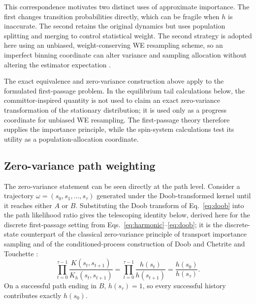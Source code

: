 \documentclass[a4paper,fleqn]{cas-sc}
\begin{document}
This correspondence motivates two distinct uses of approximate importance. The first changes
transition probabilities directly, which can be fragile when $h$ is inaccurate. The second
retains the original dynamics but uses population splitting and merging to control statistical
weight. The second strategy is adopted here using an unbiased, weight-conserving WE resampling
scheme, so an imperfect binning coordinate can alter variance and sampling allocation without
altering the estimator expectation \citep{zhang2010}.

The exact equivalence and zero-variance construction above apply to the formulated first-passage
problem. In the equilibrium tail calculations below, the committor-inspired quantity is not
used to claim an exact zero-variance transformation of the stationary distribution; it is used
only as a progress coordinate for unbiased WE resampling. The first-passage theory therefore
supplies the importance principle, while the spin-system calculations test its utility as a
population-allocation coordinate.

\subsection{Zero-variance path weighting}\label{sec:zerovar}
The zero-variance statement can be seen directly at the path level. Consider a trajectory
$\omega=(s_0,s_1,\dots,s_\tau)$ generated under the Doob-transformed kernel until it reaches
either $A$ or $B$. Substituting the Doob transform of Eq.~\eqref{eq:doob} into the path
likelihood ratio gives the telescoping identity below, derived here for the discrete
first-passage setting from Eqs.~\eqref{eq:harmonic}--\eqref{eq:doob}; it is the discrete-state
counterpart of the classical zero-variance principle of transport importance sampling
\citep{lewins1965,spanier1969,haghighat2003} and of the conditioned-process construction of
Doob \citep{doob1984} and Chetrite and Touchette \citep{chetrite2015}:
\begin{equation}
\prod_{t=0}^{\tau-1}\frac{K(s_t,s_{t+1})}{K_h(s_t,s_{t+1})}
=\prod_{t=0}^{\tau-1}\frac{h(s_t)}{h(s_{t+1})}
=\frac{h(s_0)}{h(s_\tau)} .
\label{eq:telescope}
\end{equation}
On a successful path ending in $B$, $h(s_\tau)=1$, so every successful history contributes
exactly $h(s_0)$.
\end{document}
